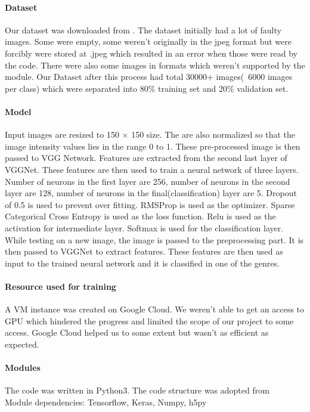 \documentclass[conference]{IEEEtran}
\begin{document}
\paragraph{Dataset\\}

Our dataset was downloaded from \cite{b7}. The dataset initially had a lot of faulty images. Some were empty, some weren’t originally in the jpeg format but were forcibly were stored at .jpeg which resulted in an error when those were read by the code. There were also some images in formats which weren’t supported by the module. Our Dataset after this process had total 30000+ images(~6000 images per class) which were separated into 80\% training set and 20\% validation set.

\paragraph{Model\\}

Input images are resized to 150 $\times$ 150 size. The are also normalized so that the image intensity values lies in the range 0 to 1. These pre-processed image is then passed to VGG Network. 
Features are extracted from the second last layer of VGGNet. These features are then used to train a neural network of three layers. Number of neurons in the first layer are 256, number of neurons in the second layer are 128, number of neurons in the final(classification) layer are 5. Dropout of 0.5 is used to prevent over fitting. RMSProp is used as the optimizer. Sparse Categorical Cross Entropy is used as the loss function. Relu is used as the activation for intermediate layer. Softmax is used for the classification layer.
While testing on a new image, the image is passed to the preprocessing part. It is then passed to VGGNet to extract features. These features are then used as input to the trained neural network and it is classified in one of the genres.

\paragraph{Resource used for training\\}
A VM instance was created on Google Cloud. We weren’t able to get an access to GPU which hindered the progress and limited the scope of our project to some access. Google Cloud helped us to some extent but wasn’t as efficient as expected. 

\paragraph{Modules\\}
The code was written in Python3. The code structure was adopted from \cite{b8} \\
 Module dependencies: Tensorflow, Keras, Numpy, h5py
\end{document}
